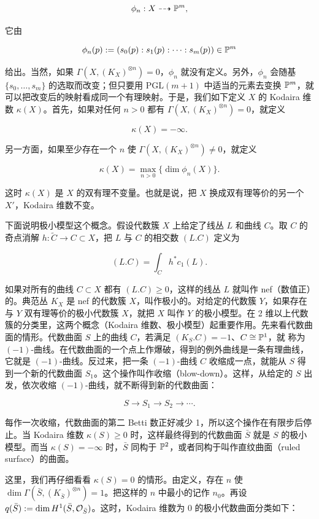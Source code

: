 \[
  \phi_n : X \dashrightarrow \mathbb{P}^m ,
\]

它由

\[
  \phi_n(p) := (s_0(p) : s_1(p) : \cdots : s_m(p)) \in \mathbb{P}^m
\]

给出。当然，如果 \(\Gamma(X,(K_X)^{\otimes n}) = 0\)，$\phi_n$ 就没有定义。另外，$\phi_n$ 会随基 $\{s_0,\dots,s_m\}$ 的选取而改变；但只要用 $\mathrm{PGL}(m+1)$ 中适当的元素去变换 $\mathbb{P}^m$，就可以把改变后的映射看成同一个有理映射。于是，我们如下定义 $X$ 的 Kodaira 维数 $\kappa(X)$。首先，如果对任何 $n>0$ 都有 \(\Gamma(X,(K_X)^{\otimes n}) = 0\)，就定义

\[
  \kappa(X) = -\infty .
\]

另一方面，如果至少存在一个 $n$ 使 \(\Gamma(X,(K_X)^{\otimes n}) \neq 0\)，就定义

\[
  \kappa(X) = \max_{n>0}\{\dim \phi_n(X)\} .
\]

这时 $\kappa(X)$ 是 $X$ 的双有理不变量。也就是说，把 $X$ 换成双有理等价的另一个 $X'$，Kodaira 维数不变。

下面说明极小模型这个概念。假设代数簇 $X$ 上给定了线丛 $L$ 和曲线 $C$。取 $C$ 的奇点消解 $h : \tilde{C} \to C \subset X$，把 $L$ 与 $C$ 的相交数 $(L.C)$ 定义为

\[
  (L.C) = \int_C h^* c_1(L) .
\]

如果对所有的曲线 $C \subset X$ 都有 $(L.C) \ge 0$，这样的线丛 $L$ 就叫作 nef（数值正）的。典范丛 $K_X$ 是 nef 的代数簇 $X$，叫作极小的。对给定的代数簇 $Y$，如果存在与 $Y$ 双有理等价的极小代数簇 $X$，就把 $X$ 叫作 $Y$ 的极小模型。在 2 维以上代数簇的分类里，这两个概念（Kodaira 维数、极小模型）起重要作用。先来看代数曲面的情形。代数曲面 $S$ 上的曲线 $C$，若满足 $(K_S.C) = -1$、$C \cong \mathbb{P}^1$，就
称为 $(-1)$-曲线。在代数曲面的一个点上作爆破，得到的例外曲线是一条有理曲线，它就是 $(-1)$-曲线。反过来，把一条 $(-1)$-曲线 $C$ 收缩成一点，就能从 $S$ 得到一个新的代数曲面 $S_1$。这个操作叫作收缩（blow-down）。这样，从给定的 $S$ 出发，依次收缩 $(-1)$-曲线，就不断得到新的代数曲面：

\[
  S \longrightarrow S_1 \longrightarrow S_2 \longrightarrow \cdots .
\]

每作一次收缩，代数曲面的第二 Betti 数正好减少 1，所以这个操作在有限步后停止。当 Kodaira 维数 $\kappa(S) \ge 0$ 时，这样最终得到的代数曲面 $\bar{S}$ 就是 $S$ 的极小模型。而当 $\kappa(S) = -\infty$ 时，$\bar{S}$ 同构于 $\mathbb{P}^2$，或者同构于叫作直纹曲面（ruled surface）的曲面。

这里，我们再仔细看看 $\kappa(S)=0$ 的情形。由定义，存在 $n$ 使 $\dim\Gamma(\bar{S},(K_{\bar{S}})^{\otimes n}) = 1$。把这样的 $n$ 中最小的记作 $n_0$。再设 $q(\bar{S}) := \dim H^1(\bar{S},\mathcal{O}_{\bar{S}})$。这时，Kodaira 维数为 0 的极小代数曲面分类如下：

